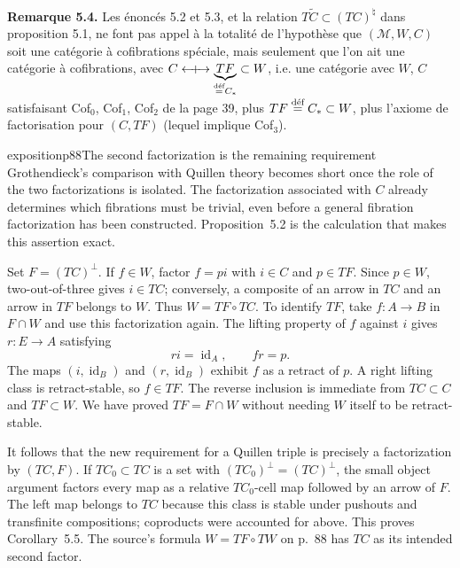 \textbf{Remarque 5.4.} Les énoncés 5.2 et 5.3, et la relation $T\tilde{C} \subset (TC)^\natural$ dans proposition 5.1, ne font pas appel à la totalité de l'hypothèse que $(\mathcal{M}, W, C)$ soit une catégorie à cofibrations spéciale, mais seulement que l'on ait une catégorie à cofibrations, avec $C \mathrel{\leftarrow\!\!\!+\!\!\!\rightarrow} \underbrace{TF}_{\defeq C_*} \subset W$, %
i.e. une catégorie avec $W$, $C$ satisfaisant Cof$_0$, Cof$_1$, Cof$_2$ de la page 39, plus $TF \defeq C_* \subset W$, plus l'axiome de factorisation pour $(C, TF)$ (lequel implique Cof$_3$).

\begin{dcomment}{exposition}{p88}{The second factorization is the remaining requirement}
Grothendieck's comparison with Quillen theory becomes short once the role of the two factorizations is isolated. The factorization associated with $C$ already determines which fibrations must be trivial, even before a general fibration factorization has been constructed. Proposition~5.2 is the calculation that makes this assertion exact.

Set $F=(TC)^{\perp}$. If $f\in W$, factor $f=pi$ with $i\in C$ and $p\in TF$. Since $p\in W$, two-out-of-three gives $i\in TC$; conversely, a composite of an arrow in $TC$ and an arrow in $TF$ belongs to $W$. Thus $W=TF\circ TC$. To identify $TF$, take $f:A\to B$ in $F\cap W$ and use this factorization again. The lifting property of $f$ against $i$ gives $r:E\to A$ satisfying
\[
 ri=\operatorname{id}_A,\qquad fr=p.
\]
The maps $(i,\operatorname{id}_B)$ and $(r,\operatorname{id}_B)$ exhibit $f$ as a retract of $p$. A right lifting class is retract-stable, so $f\in TF$. The reverse inclusion is immediate from $TC\subset C$ and $TF\subset W$. We have proved $TF=F\cap W$ without needing $W$ itself to be retract-stable.

It follows that the new requirement for a Quillen triple is precisely a factorization by $(TC,F)$. If $TC_0\subset TC$ is a set with $(TC_0)^{\perp}=(TC)^{\perp}$, the small object argument factors every map as a relative $TC_0$-cell map followed by an arrow of $F$. The left map belongs to $TC$ because this class is stable under pushouts and transfinite compositions; coproducts were accounted for above. This proves Corollary~5.5. The source's formula $W=TF\circ TW$ on p.~88 has $TC$ as its intended second factor.


\end{dcomment}
